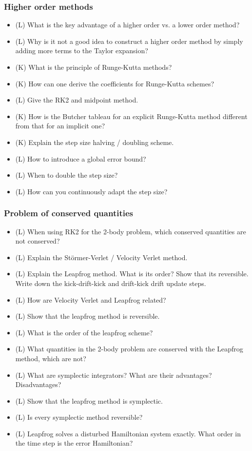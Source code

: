 \subsubsection*{Higher order methods}
\begin{itemize}
    \item (L) What is the key advantage of a higher order vs. a lower order method?
    \item (L) Why is it not a good idea to construct a higher order method by simply adding more terms to the Taylor expansion?
    \item (K) What is the principle of Runge-Kutta methods?
    \item (K) How can one derive the coefficients for Runge-Kutta schemes?
    \item (L) Give the RK2 and midpoint method.
    \item (K) How is the Butcher tableau for an explicit Runge-Kutta method different from that for an implicit one?
    \item (K) Explain the step size halving / doubling scheme.
    \item (L) How to introduce a global error bound?
    \item (L) When to double the step size?
    \item (L) How can you continuously adapt the step size?
\end{itemize}

\subsubsection*{Problem of conserved quantities}
\begin{itemize}
    \item (L) When using RK2 for the 2-body problem, which conserved quantities are not conserved?
    \item (L) Explain the Störmer-Verlet / Velocity Verlet method.
    \item (L) Explain the Leapfrog method. What is its order? Show that its reversible.
    Write down the kick-drift-kick and drift-kick drift update steps.
    \item (L) How are Velocity Verlet and Leapfrog related?
    \item (L) Show that the leapfrog method is reversible.
    \item (L) What is the order of the leapfrog scheme?
    \item (L) What quantities in the 2-body problem are conserved with the Leapfrog method, which are not?
    \item (L) What are symplectic integrators? What are their advantages? Disadvantages?
    \item (L) Show that the leapfrog method is symplectic.
    \item (L) Is every symplectic method reversible?
    \item (L) Leapfrog solves a disturbed Hamiltonian system exactly. What order in the time step is the error Hamiltonian?
\end{itemize}

